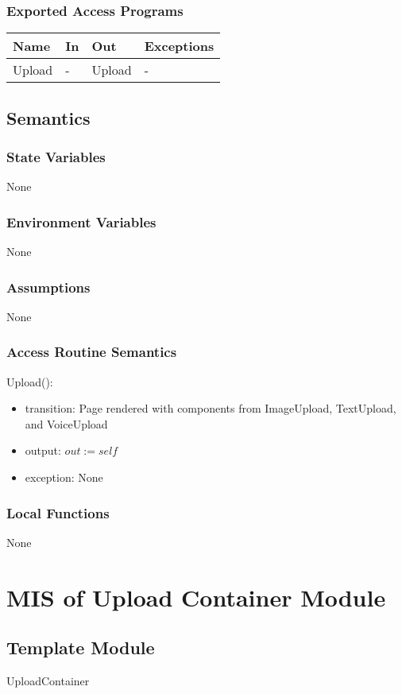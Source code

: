 \documentclass[12pt, titlepage]{article}
\begin{document}
\subsubsection{Exported Access Programs}
\begin{center}
	\begin{tabular}{p{2cm} p{4cm} p{4cm} p{2cm}}
		\hline
		\textbf{Name} & \textbf{In} & \textbf{Out} & \textbf{Exceptions} \\
		\hline
		Upload & - & Upload & - \\
		\hline
	\end{tabular}
\end{center}
\subsection{Semantics}
\subsubsection{State Variables}
None
\subsubsection{Environment Variables}
None
\subsubsection{Assumptions}
None
\subsubsection{Access Routine Semantics}
\noindent Upload():
\begin{itemize}
	\item transition: Page rendered with components from ImageUpload, 
	TextUpload, and VoiceUpload
	\item output: $out := self$
	\item exception: None
\end{itemize}
\subsubsection{Local Functions}
None

\newpage

\section{MIS of Upload Container Module} \label{UploadContainer}
\subsection{Template Module}
UploadContainer
\end{document}
